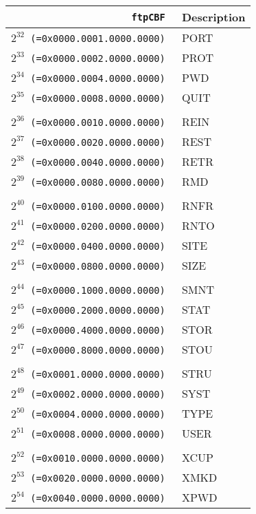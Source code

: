 \documentclass[documentation]{subfiles}
\begin{document}
\begin{minipage}{.48\textwidth}
    \begin{longtable}{>{\tt}rl}
        \toprule
        {\bf ftpCBF} & {\bf Description} \\
        \midrule\endhead%
        $2^{32}$ (=0x0000.0001.0000.0000) & PORT\\
        $2^{33}$ (=0x0000.0002.0000.0000) & PROT\\
        $2^{34}$ (=0x0000.0004.0000.0000) & PWD\\
        $2^{35}$ (=0x0000.0008.0000.0000) & QUIT\\
        \\
        $2^{36}$ (=0x0000.0010.0000.0000) & REIN\\
        $2^{37}$ (=0x0000.0020.0000.0000) & REST\\
        $2^{38}$ (=0x0000.0040.0000.0000) & RETR\\
        $2^{39}$ (=0x0000.0080.0000.0000) & RMD\\
        \\
        $2^{40}$ (=0x0000.0100.0000.0000) & RNFR\\
        $2^{41}$ (=0x0000.0200.0000.0000) & RNTO\\
        $2^{42}$ (=0x0000.0400.0000.0000) & SITE\\
        $2^{43}$ (=0x0000.0800.0000.0000) & SIZE\\
        \\
        $2^{44}$ (=0x0000.1000.0000.0000) & SMNT\\
        $2^{45}$ (=0x0000.2000.0000.0000) & STAT\\
        $2^{46}$ (=0x0000.4000.0000.0000) & STOR\\
        $2^{47}$ (=0x0000.8000.0000.0000) & STOU\\
        \\
        $2^{48}$ (=0x0001.0000.0000.0000) & STRU\\
        $2^{49}$ (=0x0002.0000.0000.0000) & SYST\\
        $2^{50}$ (=0x0004.0000.0000.0000) & TYPE\\
        $2^{51}$ (=0x0008.0000.0000.0000) & USER\\
        \\
        $2^{52}$ (=0x0010.0000.0000.0000) & XCUP\\
        $2^{53}$ (=0x0020.0000.0000.0000) & XMKD\\
        $2^{54}$ (=0x0040.0000.0000.0000) & XPWD\\

\end{longtable}
\end{minipage}
\end{document}
